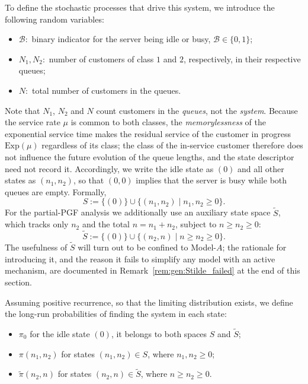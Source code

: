 To define the stochastic processes that drive this system, we introduce the following random variables:
\begin{itemize}
    \item $\mathcal{B}:$ binary indicator for the server being idle or busy, $\mathcal{B}\in \{0,1\}$;
    \item $N_1, N_2:$ number of customers of class $1$ and $2$, respectively, in their respective queues;
    \item $N:$ total number of customers in the queues.
\end{itemize}
Note that $N_1$, $N_2$ and $N$ count customers in the \emph{queues}, not the \emph{system}. Because the service rate $\mu$ is common to both classes, the \emph{memorylessness} of the exponential service time makes the residual service of the customer in progress $\mathrm{Exp}(\mu)$ regardless of its class; the class of the in-service customer therefore does not influence the future evolution of the queue lengths, and the state descriptor need not record it. Accordingly, we write the idle state as $(0)$ and all other states as $(n_1,n_2)$, so that $(0,0)$ implies that the server is busy while both queues are empty. Formally,
\begin{equation}
    S := \{(0)\} \cup \{ (n_1,n_2) \mid n_1,n_2 \geq 0 \}.
    \label{eq:gen:state_space_S}
\end{equation}
For the partial-PGF analysis we additionally use an auxiliary state space $\widetilde{S}$, which tracks only $n_2$ and the total $n = n_1 + n_2$, subject to $n \geq n_2 \geq 0$:
\begin{equation}
    \widetilde{S} := \{(0)\} \cup \{ (n_2,n) \mid n \geq n_2 \geq 0 \}.
    \label{eq:gen:state_space_Stilde}
\end{equation}
The usefulness of $\widetilde{S}$ will turn out to be confined to Model-$A$; the rationale for introducing it, and the reason it fails to simplify any model with an active mechanism, are documented in Remark~\ref{rem:gen:Stilde_failed} at the end of this section.

Assuming positive recurrence, so that the limiting distribution exists, we define the long-run probabilities of finding the system in each state:
\begin{itemize}
    \item $\pi_0$ for the idle state $(0)$, it belongs to both spaces $S$ and $\widetilde{S}$;
    \item $\pi(n_1,n_2)$ for states $(n_1,n_2) \in S$, where $n_1,n_2 \geq 0$;
    \item $\widetilde{\pi}(n_2,n)$ for states $(n_2,n) \in \widetilde{S}$, where $n \geq n_2 \geq 0$.
\end{itemize}


